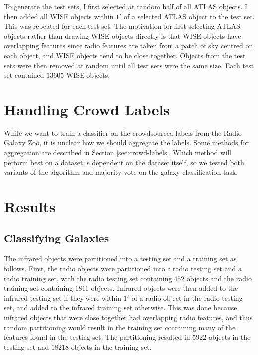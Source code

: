   To generate the test sets, I first selected at random half of all ATLAS objects. I then added all WISE objects within $1'$ of a selected ATLAS object to the test set. This was repeated for each test set. The motivation for first selecting ATLAS objects rather than drawing WISE objects directly is that WISE objects have overlapping features since radio features are taken from a patch of sky centred on each object, and WISE objects tend to be close together. Objects from the test sets were then removed at random until all test sets were the same size. Each test set contained $13605$ WISE objects.

\section{Handling Crowd Labels}
\label{sec:rgz-crowd-labels}

  While we want to train a classifier on the crowdsourced labels from the Radio Galaxy Zoo, it is unclear how we should aggregate the labels. Some methods for aggregation are described in Section \ref{sec:crowd-labels}. Which method will perform best on a dataset is dependent on the dataset itself, so we tested both variants of the \citeauthor{raykar10} algorithm and majority vote on the galaxy classification task.


\section{Results}
\label{sec:rgz-results}
  
  \subsection{Classifying Galaxies}


    The infrared objects were partitioned into a testing set and a training set as follows. First, the radio objects were partitioned into a radio testing set and a radio training set, with the radio testing set containing $452$ objects and the radio training set containing $1811$ objects. Infrared objects were then added to the infrared testing set if they were within $1'$ of a radio object in the radio testing set, and added to the infrared training set otherwise. This was done because infrared objects that were close together had overlapping radio features, and thus random partitioning would result in the training set containing many of the features found in the testing set. The partitioning resulted in $5922$ objects in the testing set and $18218$ objects in the training set.

